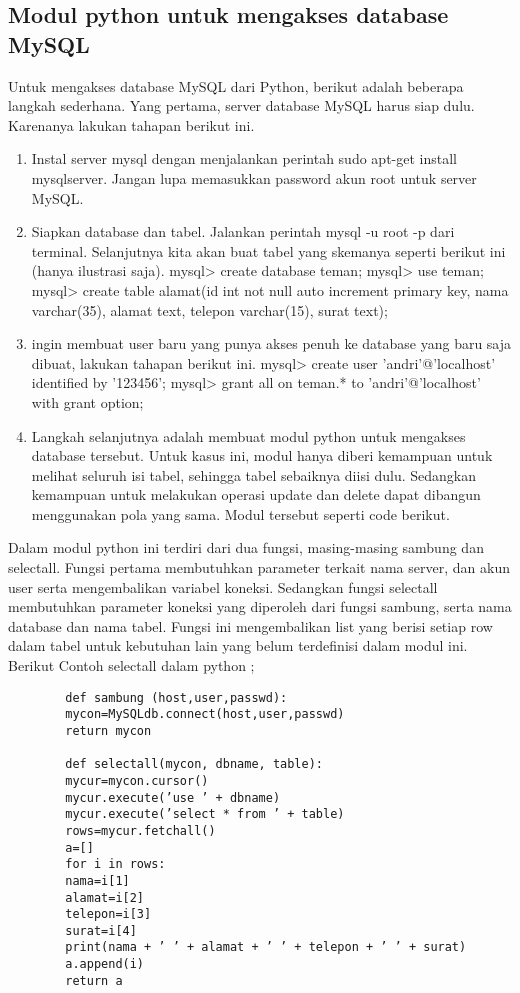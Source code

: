 \subsection {Modul python untuk mengakses database MySQL}
	Untuk mengakses database MySQL dari Python, berikut adalah beberapa langkah sederhana. Yang pertama, server database MySQL harus siap dulu. Karenanya lakukan tahapan berikut ini. 
	\begin{enumerate}
		\item Instal server mysql dengan menjalankan perintah sudo apt-get install mysqlserver. Jangan lupa memasukkan password akun root untuk server MySQL. 
		\item Siapkan database dan tabel. Jalankan perintah mysql -u root -p dari terminal. 
			Selanjutnya kita akan buat tabel yang skemanya seperti berikut ini (hanya ilustrasi saja). 
			mysql> create database teman; 
			mysql> use teman; 
			mysql> create table alamat(id int not null auto increment primary key, 
			nama varchar(35), alamat text, telepon varchar(15), surat text);

		\item  ingin membuat user baru yang punya akses penuh ke database yang baru saja dibuat, lakukan tahapan berikut ini. 
			mysql> create user 'andri'@'localhost' identified by '123456'; 	
			mysql> grant all on teman.* to 'andri'@'localhost' with grant option; 

		\item Langkah selanjutnya adalah membuat modul python untuk mengakses database tersebut. Untuk kasus ini, modul hanya diberi kemampuan untuk melihat seluruh isi tabel, sehingga tabel sebaiknya diisi dulu. Sedangkan kemampuan untuk melakukan operasi update dan delete dapat dibangun menggunakan pola yang sama. Modul tersebut seperti code berikut. 
	\end{enumerate}

Dalam modul python ini terdiri dari dua fungsi, masing-masing sambung dan selectall. Fungsi pertama membutuhkan parameter terkait nama server, dan akun user serta mengembalikan variabel koneksi. Sedangkan fungsi selectall membutuhkan parameter koneksi yang diperoleh dari fungsi sambung, serta nama database dan nama tabel. Fungsi ini mengembalikan list yang berisi setiap row dalam tabel untuk kebutuhan lain yang belum terdefinisi dalam modul ini. Berikut Contoh selectall dalam python ;

	\begin{verbatim}
		def sambung (host,user,passwd): 
		mycon=MySQLdb.connect(host,user,passwd) 
		return mycon
		
		def selectall(mycon, dbname, table): 
		mycur=mycon.cursor() 
		mycur.execute(’use ’ + dbname) 
		mycur.execute(’select * from ’ + table) 
		rows=mycur.fetchall() 
		a=[] 
		for i in rows: 
		nama=i[1] 
		alamat=i[2] 
		telepon=i[3] 
		surat=i[4] 
		print(nama + ’ ’ + alamat + ’ ’ + telepon + ’ ’ + surat) 
		a.append(i) 
		return a 
	\end{verbatim}

